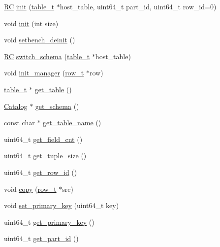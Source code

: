 \begin{DoxyCompactItemize}
\item 
\hyperlink{global_8h_a78c49a674c810fdd03d20432f7be864a}{RC} \hyperlink{classrow__t_aacb35baa21609238d8596a79228639f0}{init} (\hyperlink{classtable__t}{table\+\_\+t} $\ast$host\+\_\+table, uint64\+\_\+t part\+\_\+id, uint64\+\_\+t row\+\_\+id=0)
\item 
void \hyperlink{classrow__t_ad3c8dd1b6ec42ab9bcb55bdae25bfe48}{init} (int size)
\item 
void \hyperlink{classrow__t_acb30d289513df9c5db6f1775a0cf9312}{setbench\+\_\+deinit} ()
\item 
\hyperlink{global_8h_a78c49a674c810fdd03d20432f7be864a}{RC} \hyperlink{classrow__t_af0228d195f82091abefa28d29ac83e22}{switch\+\_\+schema} (\hyperlink{classtable__t}{table\+\_\+t} $\ast$host\+\_\+table)
\item 
void \hyperlink{classrow__t_abce8cf60a90cccfdc5ecee7eeb005806}{init\+\_\+manager} (\hyperlink{classrow__t}{row\+\_\+t} $\ast$row)
\item 
\hyperlink{classtable__t}{table\+\_\+t} $\ast$ \hyperlink{classrow__t_a71e676d99f1cb95186fc8b686d97610f}{get\+\_\+table} ()
\item 
\hyperlink{classCatalog}{Catalog} $\ast$ \hyperlink{classrow__t_a1a9f1060ee454ed679209590a13059b1}{get\+\_\+schema} ()
\item 
const char $\ast$ \hyperlink{classrow__t_a39c6ba60a76818599d48d7bbdf01e081}{get\+\_\+table\+\_\+name} ()
\item 
uint64\+\_\+t \hyperlink{classrow__t_a76ad0094b65a55ed7d1eed8edf2bad3a}{get\+\_\+field\+\_\+cnt} ()
\item 
uint64\+\_\+t \hyperlink{classrow__t_ab524208335b31ac56c95f9695365967b}{get\+\_\+tuple\+\_\+size} ()
\item 
uint64\+\_\+t \hyperlink{classrow__t_a553b2f2021b500fbe7fc6d93a99eddec}{get\+\_\+row\+\_\+id} ()
\item 
void \hyperlink{classrow__t_aca5bd47c4482a9493da85525298367f4}{copy} (\hyperlink{classrow__t}{row\+\_\+t} $\ast$src)
\item 
void \hyperlink{classrow__t_a1d331378ab894cb05c1ff18d0483b5eb}{set\+\_\+primary\+\_\+key} (uint64\+\_\+t key)
\item 
uint64\+\_\+t \hyperlink{classrow__t_a7e11cd7d6a95f897438073120eb68cff}{get\+\_\+primary\+\_\+key} ()
\item 
uint64\+\_\+t \hyperlink{classrow__t_ae6702cc7db6b72bf3082415bee9b3e9e}{get\+\_\+part\+\_\+id} ()
\item 

\end{DoxyCompactItemize}
